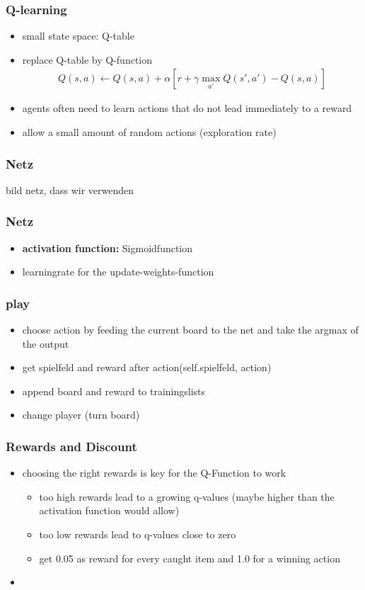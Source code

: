 \documentclass{beamer}
\begin{document}
  \begin{frame}
  \frametitle{Q-learning}
 \begin{itemize}
 \item small state space: Q-table
  \item replace Q-table by Q-function 
  \begin{align}
  Q(s,a) \leftarrow Q(s,a)+\alpha [r+\gamma \max_{a'} Q(s',a') -Q(s,a)]
  \end{align}
 \item agents often need to learn actions that do not lead immediately to a reward
 \item allow a small amount of random actions (exploration rate)
 \end{itemize}
 \end{frame}
 
 \begin{frame}
 \frametitle{Netz}
 bild netz, dass wir verwenden
 \end{frame}
  \begin{frame}
 \frametitle{Netz}
\begin{itemize}
\item \textbf{activation function:} Sigmoidfunction
\item learningrate for the update-weights-function
\end{itemize}
 \end{frame}
 
 \begin{frame}
 \frametitle{play}
 \begin{itemize}
\item choose action by feeding the current board to the net and take the argmax of the output
\item get spielfeld and reward after action(self.spielfeld, action)
\item append board and reward to trainingslists
\item change player (turn board)
\end{itemize}
 \end{frame}
 
\begin{frame}
 \frametitle{Rewards and Discount}
 \begin{itemize}
 	\item choosing the right rewards is key for the Q-Function to work
 	\begin{itemize}
 		\item too high rewards lead to a growing q-values (maybe higher than the activation function would allow)
 		\item too low rewards lead to q-values close to zero
 		\item get 0.05 as reward for every caught item and 1.0 for a winning action
 	\end{itemize}
 \item 
 \end{itemize}
\end{frame}
 
\end{document}
